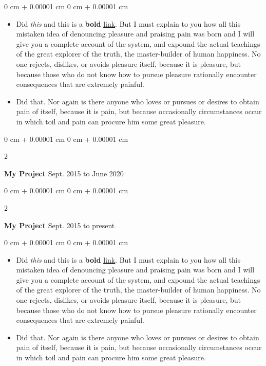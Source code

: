 \documentclass[10pt, letterpaper]{article}
\newenvironment{highlights}{
    \begin{itemize}[
        topsep=0.10 cm,
        parsep=0.10 cm,
        partopsep=0pt,
        itemsep=0pt,
        leftmargin=0 cm + 10pt
    ]
}{
    \end{itemize}
} %
\newenvironment{onecolentry}{
    \begin{adjustwidth}{
        0 cm + 0.00001 cm
    }{
        0 cm + 0.00001 cm
    }
}{
    \end{adjustwidth}
} %
\newenvironment{twocolentry}[2][]{
    \onecolentry
    \def\secondColumn{#2}
    \setcolumnwidth{\fill, 4.5 cm}
    \begin{paracol}{2}
}{
    \switchcolumn \raggedleft \secondColumn
    \end{paracol}
    \endonecolentry
} %
\begin{document}
        \vspace{0.10 cm}
        \begin{onecolentry}
            \begin{highlights}
                \item Did \textit{this} and this is a \textbf{bold} \href{https://example.com}{link}. But I must explain to you how all this mistaken idea of denouncing pleasure and praising pain was born and I will give you a complete account of the system, and expound the actual teachings of the great explorer of the truth, the master-builder of human happiness. No one rejects, dislikes, or avoids pleasure itself, because it is pleasure, but because those who do not know how to pursue pleasure rationally encounter consequences that are extremely painful.
                \item Did that. Nor again is there anyone who loves or pursues or desires to obtain pain of itself, because it is pain, but because occasionally circumstances occur in which toil and pain can procure him some great pleasure.
            \end{highlights}
        \end{onecolentry}


        \vspace{0.2 cm}

        \begin{twocolentry}{
            Sept. 2015 to June 2020
        }
            \textbf{My Project}\end{twocolentry}



        \vspace{0.2 cm}

        \begin{twocolentry}{
            Sept. 2015 to present
        }
            \textbf{My Project}\end{twocolentry}

        \vspace{0.10 cm}
        \begin{onecolentry}
            \begin{highlights}
                \item Did \textit{this} and this is a \textbf{bold} \href{https://example.com}{link}. But I must explain to you how all this mistaken idea of denouncing pleasure and praising pain was born and I will give you a complete account of the system, and expound the actual teachings of the great explorer of the truth, the master-builder of human happiness. No one rejects, dislikes, or avoids pleasure itself, because it is pleasure, but because those who do not know how to pursue pleasure rationally encounter consequences that are extremely painful.
                \item Did that. Nor again is there anyone who loves or pursues or desires to obtain pain of itself, because it is pain, but because occasionally circumstances occur in which toil and pain can procure him some great pleasure.
            \end{highlights}
        \end{onecolentry}
\end{document}
